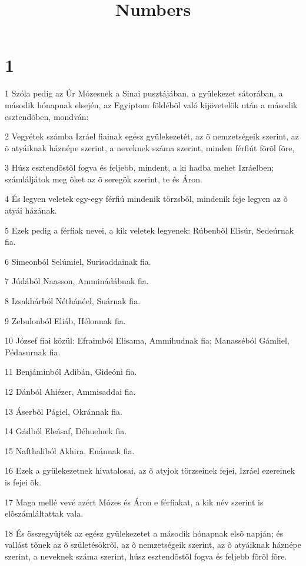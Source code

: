 

\title{Numbers}


\chapter{1}

\par 1 Szóla pedig az Úr Mózesnek a Sinai pusztájában, a gyülekezet sátorában, a második hónapnak elsején, az Egyiptom földébõl való kijövetelök után a második esztendõben, mondván:
\par 2 Vegyétek számba Izráel fiainak egész gyülekezetét, az õ nemzetségeik szerint, az õ atyáiknak háznépe szerint, a neveknek száma szerint, minden férfiút fõrõl fõre,
\par 3 Húsz esztendõstõl fogva és feljebb, mindent, a ki hadba mehet Izráelben; számláljátok meg õket az õ seregök szerint, te és Áron.
\par 4 És legyen veletek egy-egy férfiú mindenik törzsbõl, mindenik feje legyen az õ atyái házának.
\par 5 Ezek pedig a férfiak nevei, a kik veletek legyenek: Rúbenbõl Elisúr, Sedeúrnak fia.
\par 6 Simeonból Selúmiel, Surisaddainak fia.
\par 7 Júdából Naasson, Amminádábnak fia.
\par 8 Izsakhárból Néthánéel, Suárnak fia.
\par 9 Zebulonból Eliáb, Hélonnak fia.
\par 10 József fiai közül: Efraimból Elisama, Ammihudnak fia; Manasséból Gámliel, Pédasurnak fia.
\par 11 Benjáminból Adibán, Gideóni fia.
\par 12 Dánból Ahiézer, Ammisaddai fia.
\par 13 Áserbõl Págiel, Okránnak fia.
\par 14 Gádból Eleásaf, Déhuelnek fia.
\par 15 Nafthaliból Akhira, Enánnak fia.
\par 16 Ezek a gyülekezetnek hivatalosai, az õ atyjok törzseinek fejei, Izráel ezereinek is fejei õk.
\par 17 Maga mellé vevé azért Mózes és Áron e férfiakat, a kik név szerint is elõszámláltattak vala.
\par 18 És összegyûjték az egész gyülekezetet a második hónapnak elsõ napján; és vallást tõnek az õ születésökrõl, az õ nemzetségeik szerint, az õ atyáiknak háznépe szerint, a neveknek száma szerint, húsz esztendõstõl fogva és feljebb fõrõl fõre.

